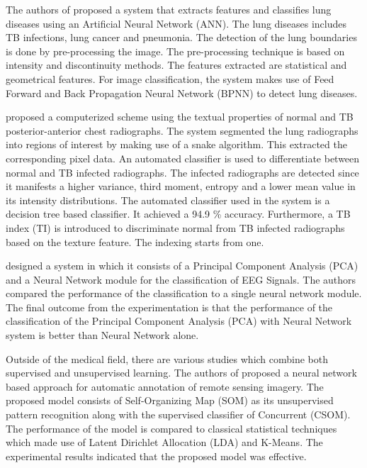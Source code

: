 \documentclass[11pt]{article}
\begin{document}
	The authors of \cite{Pune2016} proposed a system that extracts features and classifies lung diseases using an Artificial Neural Network (ANN). The lung diseases includes TB infections, lung cancer and pneumonia. The detection of the lung boundaries is done by pre-processing the image. The pre-processing technique is based on intensity and discontinuity methods. The features extracted are statistical and geometrical features. For image classification, the system makes use of Feed Forward and Back Propagation Neural Network (BPNN) to detect lung diseases.
	
	\cite{tan2012computer} proposed a computerized scheme using the textual properties of normal and TB posterior-anterior chest radiographs. The system segmented the lung radiographs into regions of interest by making use of a snake algorithm. This extracted the corresponding pixel data. An automated classifier is used to differentiate between normal and TB infected radiographs. The infected radiographs are detected since it manifests a higher variance, third moment, entropy and a lower mean value in its intensity distributions. The automated classifier used in the system is a decision tree based classifier. It achieved a 94.9 \% accuracy. Furthermore, a TB index (TI) is introduced to discriminate normal from TB infected radiographs based on the texture feature. The indexing starts from one.

	\cite{kottaimalai_eeg_2013} designed a system in which it consists of a Principal Component Analysis (PCA) and a Neural Network module for the classification of EEG Signals. The authors compared the performance of the classification to a single neural network module. The final outcome from the experimentation is that the performance of the classification of the Principal Component Analysis (PCA) with Neural Network system is better than Neural Network alone. 
	
	Outside of the medical field, there are various studies which combine both supervised and unsupervised learning. The authors of \cite{neagoe_new_2014} proposed a neural network based approach for automatic annotation of remote sensing imagery. The proposed model consists of Self-Organizing Map (SOM) as its unsupervised pattern recognition along with the supervised classifier of Concurrent (CSOM). The performance of the model is compared to classical statistical techniques which made use of Latent Dirichlet Allocation (LDA) and K-Means. The experimental results indicated that the proposed model was effective.
	
\end{document}
